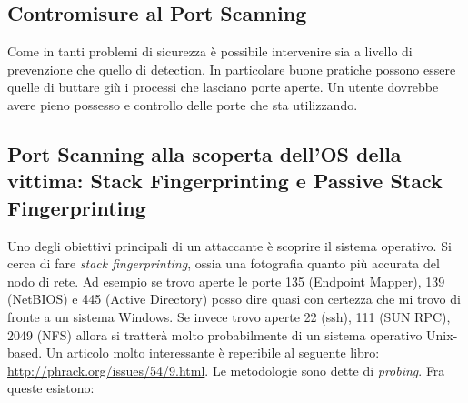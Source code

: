 \documentclass[14pt]{extreport}
\begin{document}
\subsection{Contromisure al Port Scanning}

Come in tanti problemi di sicurezza è possibile intervenire sia a livello di prevenzione che quello di detection. In particolare buone pratiche possono essere quelle di buttare giù i processi che lasciano porte aperte. Un utente dovrebbe avere pieno possesso e controllo delle porte che sta utilizzando.

\subsection{Port Scanning alla scoperta dell'OS della vittima: Stack Fingerprinting e Passive Stack Fingerprinting}

Uno degli obiettivi principali di un attaccante è scoprire il sistema operativo. Si cerca di fare \textit{stack fingerprinting}, ossia una fotografia quanto più accurata del nodo di rete. Ad esempio se trovo aperte le porte 135 (Endpoint Mapper), 139 (NetBIOS) e 445 (Active Directory) posso dire quasi con certezza che mi trovo di fronte a un sistema Windows. Se invece trovo aperte 22 (ssh), 111 (SUN RPC), 2049 (NFS) allora si tratterà molto probabilmente di un sistema operativo Unix-based.
Un articolo molto interessante è reperibile al seguente libro: \url{http://phrack.org/issues/54/9.html}.
Le metodologie sono dette di \textit{probing}. Fra queste esistono:
\end{document}
